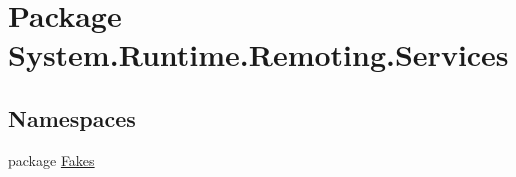 \hypertarget{namespace_system_1_1_runtime_1_1_remoting_1_1_services}{\section{Package System.\-Runtime.\-Remoting.\-Services}
\label{namespace_system_1_1_runtime_1_1_remoting_1_1_services}
}
\subsection*{Namespaces}
\begin{DoxyCompactItemize}
\item 
package \hyperlink{namespace_system_1_1_runtime_1_1_remoting_1_1_services_1_1_fakes}{Fakes}
\end{DoxyCompactItemize}
